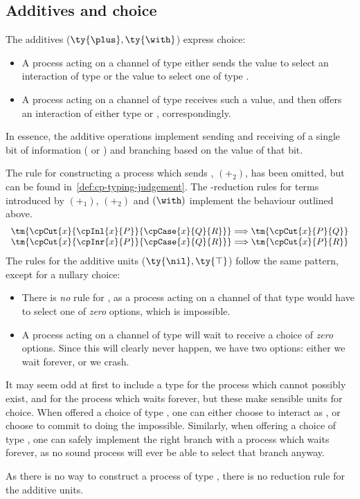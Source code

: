 \documentclass[UKenglish]{llncs}
\begin{document}
\subsection{Additives and choice}
\label{sec:cp-additives}
The additives ($\ty{\plus}, \ty{\with}$) express choice:
\begin{itemize}
\item
  A process acting on a channel of type  either sends the value
   to select an interaction of type  or the value
   to select one of type . 
\item
  A process acting on a channel of type  receives such a value,
  and then offers an interaction of either type  or ,
  correspondingly.
\end{itemize}
In essence, the additive operations implement sending and receiving of a single
bit of information ( or ) and branching based on
the value of that bit. 
\begin{center}
  \cpInfWith
\end{center}
The rule for constructing a process which sends , $(\plus_2)$,
has been omitted, but can be found in~\cref{def:cp-typing-judgement}.
The \textbeta-reduction rules for terms introduced by $(\plus_1)$, $(\plus_2)$
and $(\with)$ implement the behaviour outlined above.
\[
  \begin{array}{c}
    \tm{\cpCut{x}{\cpInl{x}{P}}{\cpCase{x}{Q}{R}}} \Longrightarrow \tm{\cpCut{x}{P}{Q}}
    \\
    \tm{\cpCut{x}{\cpInr{x}{P}}{\cpCase{x}{Q}{R}}} \Longrightarrow \tm{\cpCut{x}{P}{R}}
  \end{array}
\]
%
The rules for the additive units ($\ty{\nil}, \ty{\top}$) follow the same
pattern, except for a nullary choice:
\begin{itemize}
\item
  There is \emph{no} rule for \ty{\nil}, as a process acting on a channel of
  that type would have to select one of \emph{zero} options, which is impossible.
\item
  A process acting on a channel of type \ty{\top} will wait to receive a choice
  of \emph{zero} options. Since this will clearly never happen, we have two
  options: either we wait forever, or we crash.
\end{itemize}
It may seem odd at first to include a type for the process which cannot possibly
exist, and for the process which waits forever, but these make sensible units
for choice.
When offered a choice of type , one can either choose to
interact as , or choose to commit to doing the impossible.
Similarly, when offering a choice of type , one can safely
implement the right branch with a process which waits forever, as no sound
process will ever be able to select that branch anyway.
\begin{center}
  \cpInfNil
  \cpInfTop
\end{center}
As there is no way to construct a process of type \ty{\nil}, there is no
reduction rule for the additive units.
\end{document}

